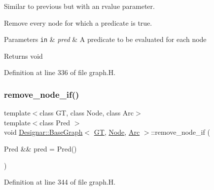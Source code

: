 Similar to previous but with an rvalue parameter. 

Remove every node for which a predicate is true.


\begin{DoxyParams}[1]{Parameters}
\mbox{\tt in}  & {\em pred} & A predicate to be evaluated for each node \\
\hline
\end{DoxyParams}
\begin{DoxyReturn}{Returns}
void 
\end{DoxyReturn}


Definition at line 336 of file graph.\+H.

\mbox{\label{class_designar_1_1_base_graph_a6e63659d272255254f6abc29c1e09724}} 
\subsubsection{\texorpdfstring{remove\+\_\+node\+\_\+if()}{remove\_node\_if()}\hspace{0.1cm}{\footnotesize\ttfamily [2/2]}}
{\footnotesize\ttfamily template$<$class GT, class Node, class Arc$>$ \\
template$<$class Pred $>$ \\
void \hyperlink{class_designar_1_1_base_graph}{Designar\+::\+Base\+Graph}$<$ \hyperlink{demo-buildgraph_8_c_a3001c40d2c31ca87ed96cd7d1334a55e}{GT}, \hyperlink{namespace_designar_a5af326c65aa2bd26b26c410f2030d09e}{Node}, \hyperlink{namespace_designar_a3f55fb5513d62ff47cbc8f72b8e95d6f}{Arc} $>$\+::remove\+\_\+node\+\_\+if (\begin{DoxyParamCaption}\item[{Pred \&\&}]{pred = {\ttfamily Pred()} }\end{DoxyParamCaption})\hspace{0.3cm}{\ttfamily [inline]}}



Definition at line 344 of file graph.\+H.

\mbox{\label{class_designar_1_1_base_graph_ab73705a167e91d0982a9f149b1d7e71b}} 
